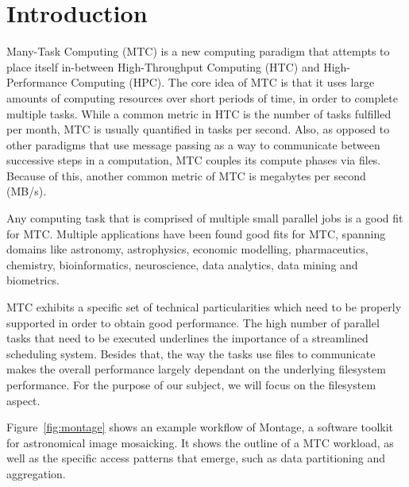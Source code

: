 
\chapter{Introduction} %

\label{Chapter1} %



Many-Task Computing (MTC)\cite{mtc} is a new computing paradigm that attempts to place itself in-between High-Throughput Computing (HTC) and High-Performance Computing (HPC). The core idea of MTC is that it uses large amounts of computing resources over short periods of time, in order to complete multiple tasks. While a common metric in HTC is the number of tasks fulfilled per month, MTC is usually quantified in tasks per second. Also, as opposed to other paradigms that use message passing as a way to communicate between successive steps in a computation, MTC couples its compute phases via files. Because of this, another common metric of MTC is megabytes per second (MB/s).

Any computing task that is comprised of multiple small parallel jobs is a good fit for MTC. Multiple applications have been found good fits for MTC\cite{mtc}, spanning domains like astronomy, astrophysics, economic modelling, pharmaceutics, chemistry, bioinformatics, neuroscience, data analytics, data mining and biometrics.

MTC exhibits a specific set of technical particularities which need to be properly supported in order to obtain good performance. The high number of parallel tasks that need to be executed underlines the importance of a streamlined scheduling system. Besides that, the way the tasks use files to communicate makes the overall performance largely dependant on the underlying filesystem performance. For the purpose of our subject, we will focus on the filesystem aspect.

Figure~\ref{fig:montage} shows an example workflow of Montage\cite{montage}, a software toolkit for astronomical image mosaicking. It shows the outline of a MTC workload, as well as the specific access patterns that emerge, such as data partitioning and aggregation.

